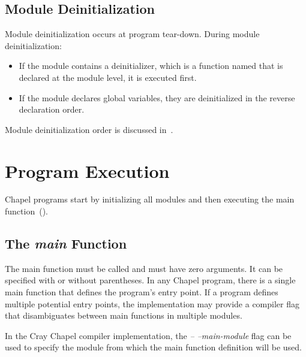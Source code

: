 \subsection{Module Deinitialization}
\label{Module_Deinitialization}

Module deinitialization occurs at program tear-down.
During module deinitialization:

\begin{itemize}

\item If the module contains a deinitializer, which is a function
named  that is declared at the module level,
it is executed first.

\item If the module declares global variables, they are deinitialized
in the reverse declaration order.

\end{itemize}


Module deinitialization order is discussed
in~.


\section{Program Execution}
\label{Program_Execution}

Chapel programs start by initializing all modules and then executing
the main function~().

\subsection{The {\em main} Function}
\label{The_main_Function}

The main function must be called  and must have zero
arguments.  It can be specified with or without parentheses.  In any
Chapel program, there is a single main function that defines the
program's entry point.  If a program defines multiple potential entry
points, the implementation may provide a compiler flag that
disambiguates between main functions in multiple modules.

\begin{craychapel}
In the Cray Chapel compiler implementation, the \emph{--
--main-module} flag can be used to specify the module from which the
main function definition will be used.
\end{craychapel}


